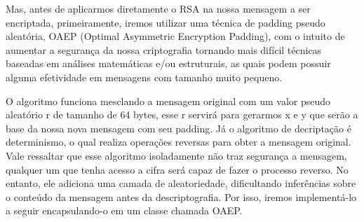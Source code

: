 \documentclass[11pt]{article}
\begin{document}
Mas, antes de aplicarmos diretamente o RSA na nossa mensagem a ser
encriptada, primeiramente, iremos utilizar uma técnica de padding pseudo
aleatória, OAEP (Optimal Asymmetric Encryption Padding), com o intuito
de aumentar a segurança da nossa criptografia tornando mais difícil
técnicas baseadas em análises matemáticas e/ou estruturais, as quais
podem possuir alguma efetividade em mensagens com tamanho muito pequeno.

O algoritmo funciona mesclando a mensagem original com um valor pseudo
aleatório r de tamanho de 64 bytes, esse r servirá para gerarmos x e y
que serão a base da nossa nova mensagem com seu padding. Já o algoritmo
de decriptação é determinismo, o qual realiza operações reversas para
obter a mensagem original. Vale ressaltar que esse algoritmo
isoladamente não traz segurança a mensagem, qualquer um que tenha acesso
a cifra será capaz de fazer o processo reverso. No entanto, ele adiciona
uma camada de aleatoriedade, dificultando inferências sobre o conteúdo
da mensagem antes da descriptografia. Por isso, iremos implementá-lo a
seguir encapsulando-o em um classe chamada OAEP.
\end{document}
